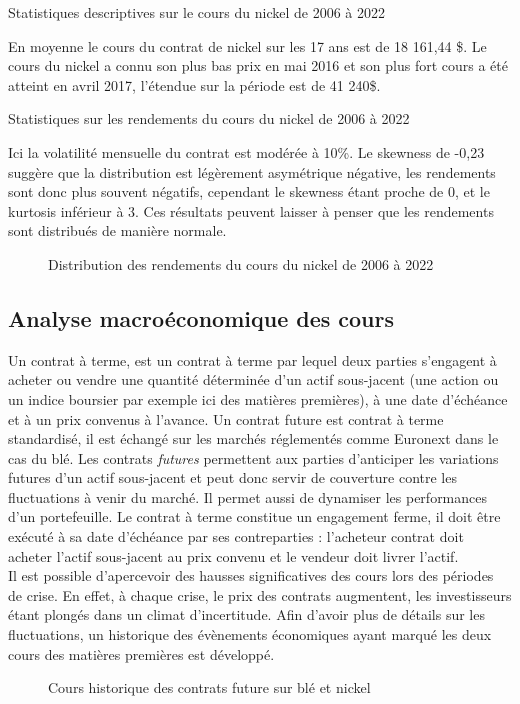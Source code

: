 \begin{table}[H]
    \centering
    \caption{Statistiques descriptives sur le cours du nickel de 2006 à 2022}
    \sffamily
    \resizebox{\textwidth}{!}{}
\end{table}
En moyenne le cours du contrat de nickel sur les 17 ans est de 18 161,44 \$. Le cours du nickel a connu son plus bas prix en mai 2016 et son plus fort cours a été atteint en avril 2017, l'étendue sur la période est de 41 240\$.
\begin{table}[H]
    \centering
    \caption{Statistiques sur les rendements du cours du nickel de 2006 à 2022}
    \sffamily
    \resizebox{\textwidth}{!}{}
\end{table}
Ici la volatilité mensuelle du contrat est modérée à 10\%. Le skewness de -0,23 suggère que la distribution est légèrement asymétrique négative, les rendements sont donc plus souvent négatifs, cependant le skewness étant proche de 0, et le kurtosis inférieur à 3. Ces résultats peuvent laisser à penser que les rendements sont 
distribués de manière normale.
\begin{figure}[H]
    \centering
    \resizebox{\textwidth}{!}{}
    \caption{Distribution des rendements du cours du nickel de 2006 à 2022}
\end{figure}
\clearpage
\subsection{Analyse macroéconomique des cours}
Un contrat à terme, est un contrat à terme par lequel deux parties s'engagent à acheter ou vendre une quantité déterminée d'un actif sous-jacent (une 
action ou un indice boursier par exemple ici des matières premières), à une date d'échéance et à un prix convenus à l'avance. Un contrat future est contrat à terme 
standardisé, il est échangé sur les marchés réglementés comme Euronext dans le cas du blé. Les contrats \textit{futures} permettent aux parties d'anticiper les variations 
futures d'un actif sous-jacent et peut donc servir de couverture contre les fluctuations à venir du marché. Il permet aussi de dynamiser les performances d'un 
portefeuille. Le contrat à terme constitue un engagement ferme, il doit être exécuté à sa date d'échéance par ses contreparties : l'acheteur contrat doit acheter l'actif 
sous-jacent au prix convenu et le vendeur doit livrer l'actif.\\[11pt]
Il est possible d'apercevoir des hausses significatives des cours lors des périodes de crise. En effet, à chaque crise, le prix des contrats augmentent, les investisseurs 
étant plongés dans un climat d'incertitude. Afin d'avoir plus de détails sur les fluctuations, un historique des évènements économiques ayant marqué les deux cours des 
matières premières est développé.
\begin{figure}[H]
    \centering
    \resizebox{\textwidth}{!}{}
    \caption{Cours historique des contrats future sur blé et nickel}
\end{figure}

